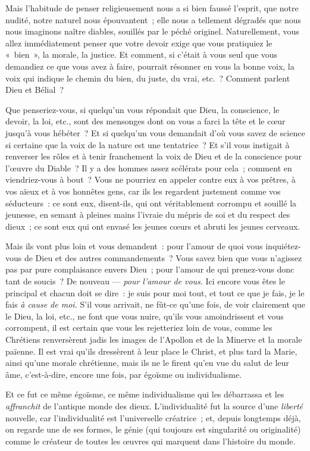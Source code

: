 \documentclass[french,twoside]{book} %
\begin{document}
Mais l’habitude de penser religieusement nous a si bien faussé l’esprit, que notre nudité, notre naturel nous épouvantent ; elle nous a tellement dégradés que nous nous imaginons naître diables, souillés par le péché originel. Naturellement, vous allez immédiatement penser que votre devoir exige que vous pratiquiez le « bien », la morale, la justice. Et comment, si c’était à vous seul que vous demandiez ce que vous avez à faire, pourrait résonner en vous la bonne voix, la voix qui indique le chemin du bien, du juste, du vrai, etc. ? Comment parlent Dieu et Bélial ?\par
Que penseriez-vous, si quelqu’un vous répondait que Dieu, la conscience, le devoir, la loi, etc., sont des mensonges dont on vous a farci la tête et le cœur jusqu’à vous hébéter ? Et si quelqu’un vous demandait  d’où vous savez de science si certaine que la voix de la nature est une tentatrice ? Et s’il vous instigait à renverser les rôles et à tenir franchement la voix de Dieu et de la conscience pour l’œuvre du Diable ? Il y a des hommes assez scélérats pour cela ; comment en viendriez-vous à bout ? Vous ne pourriez en appeler contre eux à vos prêtres, à vos aïeux et à vos honnêtes gens, car ils les regardent justement comme vos séducteurs : ce sont eux, disent-ils, qui ont véritablement corrompu et souillé la jeunesse, en semant à pleines mains l’ivraie du mépris de soi et du respect des dieux ; ce sont eux qui ont envasé les jeunes cœurs et abruti les jeunes cerveaux.\par
Mais ils vont plus loin et vous demandent : pour l’amour de quoi vous inquiétez-vous de Dieu et des autres commandements ? Vous savez bien que vous n’agissez pas par pure complaisance envers Dieu ; pour l’amour de qui prenez-vous donc tant de soucis ? De nouveau — \emph{pour l’amour de vous}. Ici encore vous êtes le principal et chacun doit se dire : je suis pour moi tout, et tout ce que je fais, je le fais \emph{à cause de moi.} S’il vous arrivait, ne fût-ce qu’une fois, de voir clairement que le Dieu, la loi, etc., ne font que vous nuire, qu’ils vous amoindrissent et vous corrompent, il est certain que vous les rejetteriez loin de vous, comme les Chrétiens renversèrent jadis les images de l’Apollon et de la Minerve et la morale païenne. Il est vrai qu’ils dressèrent à leur place le Christ, et plus tard la Marie, ainsi qu’une morale chrétienne, mais ils ne le firent qu’en vue du salut de leur âme, c’est-à-dire, encore une fois, par égoïsme ou individualisme.\par
Et ce fut ce même égoïsme, ce même individualisme qui les débarrassa et les \emph{affranchit} de l’antique monde des dieux. L’individualité fut la source d’une \emph{liberté} nouvelle, car l’individualité est l’universelle créatrice ; et, depuis longtemps déjà, on regarde une de ses formes, le génie (qui toujours est singularité ou  originalité) comme le créateur de toutes les œuvres qui marquent dans l’histoire du monde.\par
\end{document}
